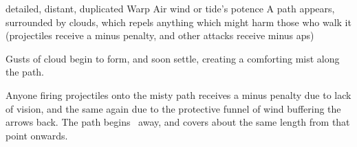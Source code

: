   {detailed, distant, duplicated}%
  {Warp}%
  {Air}%
  {wind or tide's potence}%
  {A path appears, surrounded by clouds, which repels anything which might harm those who walk it (projectiles receive a minus  penalty, and other attacks receive minus  \glspl{ap})}%
  {Gusts of cloud begin to form, and soon settle, creating a comforting mist along the path.

    Anyone firing projectiles onto the misty path receives a minus  penalty due to lack of vision, and the same again due to the protective funnel of wind buffering the arrows back.
    The path begins \spellRange\ away, and covers about the same length from that point onwards.
}
